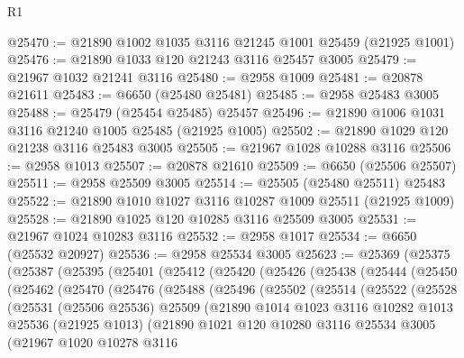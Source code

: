\begin{lexlean}{R1}
\begin{coremodule}
@25470 := @21890 @1002 @1035 @3116 @21245 @1001 @25459 (@21925 @1001)
@25476 := @21890 @1033 @120 @21243 @3116 @25457 @3005
@25479 := @21967 @1032 @21241 @3116
@25480 := @2958 @1009
@25481 := @20878 @21611
@25483 := @6650 (@25480 @25481)
@25485 := @2958 @25483 @3005
@25488 := @25479 (@25454 @25485) @25457
@25496 := @21890 @1006 @1031 @3116 @21240 @1005 @25485 (@21925 @1005)
@25502 := @21890 @1029 @120 @21238 @3116 @25483 @3005
@25505 := @21967 @1028 @10288 @3116
@25506 := @2958 @1013
@25507 := @20878 @21610
@25509 := @6650 (@25506 @25507)
@25511 := @2958 @25509 @3005
@25514 := @25505 (@25480 @25511) @25483
@25522 := @21890 @1010 @1027 @3116 @10287 @1009 @25511 (@21925 @1009)
@25528 := @21890 @1025 @120 @10285 @3116 @25509 @3005
@25531 := @21967 @1024 @10283 @3116
@25532 := @2958 @1017
@25534 := @6650 (@25532 @20927)
@25536 := @2958 @25534 @3005
@25623 := @25369
    (@25375
      (@25387
        (@25395
          (@25401
            (@25412
              (@25420
                (@25426
                  (@25438
                    (@25444
                      (@25450
                        (@25462
                          (@25470
                            (@25476
                              (@25488
                                (@25496
                                  (@25502
                                    (@25514
                                      (@25522
                                        (@25528
                                          (@25531
                                            (@25506 @25536)
                                            @25509
                                            (@21890
                                              @1014
                                              @1023
                                              @3116
                                              @10282
                                              @1013
                                              @25536
                                              (@21925 @1013)
                                              (@21890
                                                @1021
                                                @120
                                                @10280
                                                @3116
                                                @25534
                                                @3005
                                                (@21967
                                                  @1020
                                                  @10278
                                                  @3116

\end{coremodule}
\end{lexlean}
